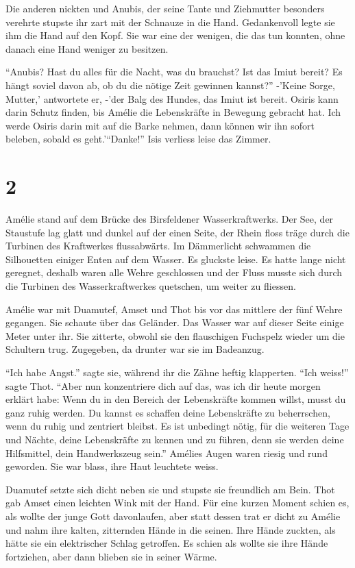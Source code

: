 \documentclass[11pt,titlepage,a5paper]{book}
\begin{document}
Die anderen nickten und Anubis, der seine Tante und Ziehmutter besonders verehrte stupste ihr zart mit der Schnauze in die Hand. Gedankenvoll legte sie ihm die Hand auf den Kopf. Sie war eine der wenigen, die das tun konnten, ohne danach eine Hand weniger zu besitzen.

"`Anubis? Hast du alles für die Nacht, was du brauchst? Ist das Imiut bereit? Es hängt soviel davon ab, ob du die nötige Zeit gewinnen kannst?"' -'Keine Sorge, Mutter,' antwortete er, -'der Balg des Hundes, das Imiut ist bereit. Osiris kann darin Schutz finden, bis Amélie die Lebenskräfte in Bewegung gebracht hat. Ich werde Osiris darin mit auf die Barke nehmen, dann können wir ihn sofort beleben, sobald es geht.'"`Danke!"' Isis verliess leise das Zimmer.

\section*{2}

Amélie stand auf dem Brücke des Birsfeldener Wasserkraftwerks. Der See, der Staustufe lag glatt und dunkel auf der einen Seite, der Rhein floss träge durch die Turbinen des Kraftwerkes flussabwärts. Im Dämmerlicht schwammen die Silhouetten einiger Enten auf dem Wasser. Es gluckste leise. Es hatte lange nicht geregnet, deshalb waren alle Wehre geschlossen und der Fluss musste sich durch die Turbinen des Wasserkraftwerkes quetschen, um weiter zu fliessen.

Amélie war mit Duamutef, Amset und Thot bis vor das mittlere der fünf Wehre gegangen. Sie schaute über das Geländer. Das Wasser war auf dieser Seite einige Meter unter ihr. Sie zitterte, obwohl sie den flauschigen Fuchspelz wieder um die Schultern trug. Zugegeben, da drunter war sie im Badeanzug.

"`Ich habe Angst."' sagte sie, während ihr die Zähne heftig klapperten. "`Ich weiss!"' sagte Thot. "`Aber nun konzentriere dich auf das, was ich dir heute morgen erklärt habe: Wenn du in den Bereich der Lebenskräfte kommen willst, musst du ganz ruhig werden. Du kannst es schaffen deine Lebenskräfte zu beherrschen, wenn du ruhig und zentriert bleibst. Es ist unbedingt nötig, für die weiteren Tage und Nächte, deine Lebenskräfte zu kennen und zu führen, denn sie werden deine Hilfsmittel, dein Handwerkszeug sein."' Amélies Augen waren riesig und rund geworden. Sie war blass, ihre Haut leuchtete weiss. 

Duamutef setzte sich dicht neben sie und stupste sie freundlich am Bein. Thot gab Amset einen leichten Wink mit der Hand. Für eine kurzen Moment schien es, als wollte der junge Gott davonlaufen, aber statt dessen trat er dicht zu Amélie und nahm ihre kalten, zitternden Hände in die seinen. Ihre Hände zuckten, als hätte sie ein elektrischer Schlag getroffen. Es schien als wollte sie ihre Hände fortziehen, aber dann blieben sie in seiner Wärme.
\end{document}
